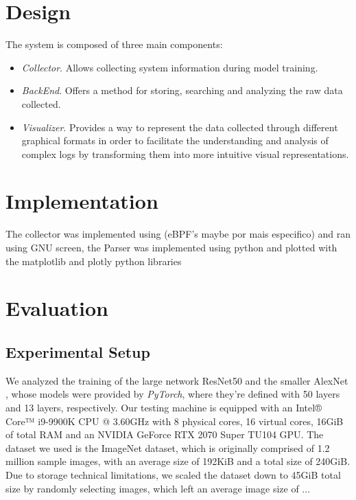 \documentclass[conference]{IEEEtran}
\begin{document}
\section{Design}
The system is composed of three main components:
\begin{itemize}
	\item \textit{Collector}. Allows collecting system information during model training.
	\item \textit{BackEnd}. Offers a method for storing, searching and analyzing the raw data collected.
	\item \textit{Visualizer}. Provides a way to represent the data collected through different graphical formats in order to facilitate the understanding and analysis of complex logs by transforming them into more intuitive visual representations.
\end{itemize}

\section{Implementation}
The collector was implemented using (eBPF's maybe por mais especifico) and ran using GNU screen, the Parser was implemented using python and plotted with the matplotlib and plotly python libraries

\section{Evaluation}

\subsection{Experimental Setup}

We analyzed the training of the large network ResNet50 \cite{resnet50} and the smaller AlexNet \cite{alexnet}, whose models were
provided by \textit{PyTorch}, where they're defined with 50 layers and 13 layers, respectively. Our testing machine is equipped with an Intel® Core™ i9-9900K CPU @ 3.60GHz with
8 physical cores, 16 virtual cores, 16GiB of total RAM and an NVIDIA GeForce RTX 2070 Super TU104 GPU. The dataset we used is the ImageNet \cite{imagenet} dataset, which is originally comprised of 1.2 million sample images, with an average size of 192KiB and a total size of 240GiB. Due to storage technical limitations, we scaled the dataset down to 45GiB total size by randomly selecting images, which left an average image size of ...
\end{document}
